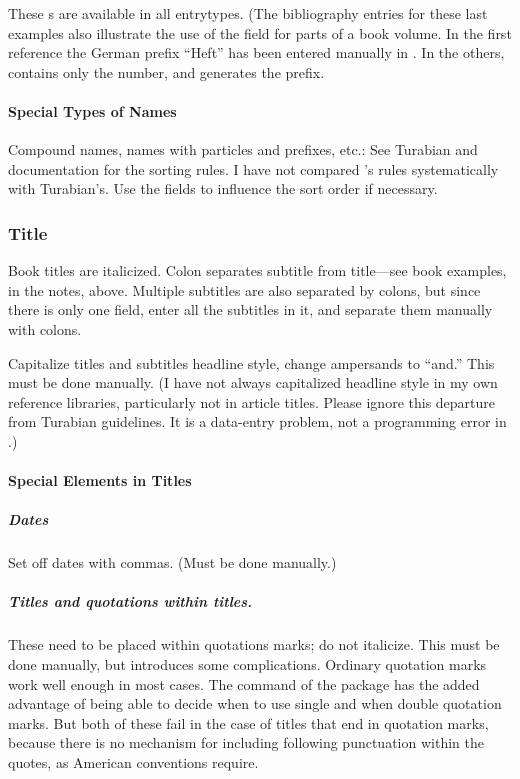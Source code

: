 \documentclass{ltxdockit}[2010/02/12]
\begin{document}
These s are available in all entrytypes.\autocites[][]{2766:pseud,2766:uncertain,2766:anon} (The bibliography entries for these last examples also illustrate the use of the  field for parts of a book volume. In the first reference the German prefix \enquote{Heft} has been entered manually in . In the others,  contains only the number, and  generates the prefix.\label{parthefte}

\paragraph{Special Types of Names}
Compound names, names with particles and prefixes, etc.: See Turabian and  documentation for the sorting rules. I have not compared 's rules systematically with Turabian's. Use the  fields to influence the sort order if necessary.

\subsubsection{Title}
Book titles are italicized. Colon separates subtitle from title---see book examples, in the notes, above.
Multiple subtitles are also separated by colons, but since there is only one  field, enter all the subtitles in it, and separate them manually with colons.

Capitalize titles and subtitles headline style, change ampersands to ``and.'' This must be done manually. (I have not always capitalized headline style in my own reference libraries, particularly not in article titles. Please ignore this departure from Turabian guidelines. It is a data-entry problem, not a programming error in .)

\paragraph{Special Elements in Titles}

\subparagraph{Dates} Set off dates with commas. (Must be done manually.)

\subparagraph{Titles and quotations within titles.} These need to be placed within quotations marks; do not italicize. This must be done manually, but introduces some complications. Ordinary quotation marks work well enough in most cases. The  command of the  package has the added advantage of being able to decide when to use single and when double quotation marks. But both of these fail in the case of titles that end in quotation marks, because there is no mechanism for including following punctuation within the quotes, as American conventions require. 
\end{document}
